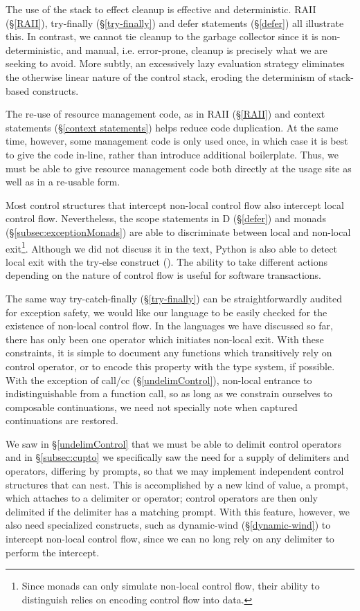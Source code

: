 \documentclass[11pt]{article}
\begin{document}
The use of the stack to effect cleanup is effective and deterministic.
RAII (\S\ref{RAII}), try-finally (\S\ref{try-finally}) and defer statements (\S\ref{defer}) all illustrate this.
In contrast, we cannot tie cleanup to the garbage collector since it is non-deterministic, and manual, i.e. error-prone, cleanup is precisely what we are seeking to avoid.
More subtly, an excessively lazy evaluation strategy eliminates the otherwise linear nature of the control stack, eroding the determinism of stack-based constructs.

The re-use of resource management code, as in RAII (\S\ref{RAII}) and context statements (\S\ref{context statements}) helps reduce code duplication.
At the same time, however, some management code is only used once, in which case it is best to give the code in-line, rather than introduce additional boilerplate.
Thus, we must be able to give resource management code both directly at the usage site as well as in a re-usable form.

Most control structures that intercept non-local control flow also intercept local control flow.
Nevertheless, the scope statements in D (\S\ref{defer}) and monads (\S\ref{subsec:exceptionMonads}) are able to discriminate between local and non-local exit\footnote{Since monads can only simulate non-local control flow, their ability to distinguish relies on encoding control flow into data.}.
Although we did not discuss it in the text, Python is also able to detect local exit with the try-else construct (\cite{pythonDocs}).
The ability to take different actions depending on the nature of control flow is useful for software transactions.

The same way try-catch-finally (\S\ref{try-finally}) can be straightforwardly audited for exception safety, we would like our language to be easily checked for the existence of non-local control flow.
In the languages we have discussed so far, there has only been one operator which initiates non-local exit.
With these constraints, it is simple to document any functions which transitively rely on control operator, or to encode this property with the type system, if possible.
With the exception of call/cc (\S\ref{undelimControl}), non-local entrance to indistinguishable from a function call, so as long as we constrain ourselves to composable continuations, we need not specially note when captured continuations are restored.

We saw in \S\ref{undelimControl} that we must be able to delimit control operators and in \S\ref{subsec:cupto} we specifically saw the need for a supply of delimiters and operators, differing by prompts, so that we may implement independent control structures that can nest.
This is accomplished by a new kind of value, a prompt, which attaches to a delimiter or operator; control operators are then only delimited if the delimiter has a matching prompt.
With this feature, however, we also need specialized constructs, such as dynamic-wind (\S\ref{dynamic-wind}) to intercept non-local control flow, since we can no long rely on any delimiter to perform the intercept.
\end{document}
